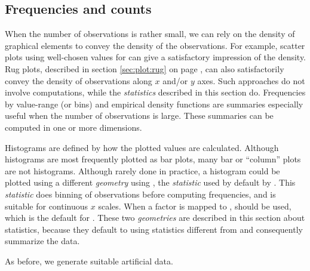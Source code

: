 \documentclass[krantz2]{krantz}\usepackage{knitr}
\begin{document}

\subsection{Frequencies and counts}\label{sec:histogram}\label{sec:plot:histogram}

When the number of observations is rather small, we can rely on the density of graphical elements to convey the density of the observations. For example, scatter plots using well-chosen values for  can give a satisfactory impression of the density. Rug plots, described in section \ref{sec:plot:rug} on page \pageref{sec:plot:rug}, can also satisfactorily convey the density of observations along $x$ and/or $y$ axes. Such approaches do not involve computations, while the \emph{statistics} described in this section do. Frequencies by value-range (or bins) and empirical density functions are summaries especially useful when the number of observations is large. These summaries can be computed in one or more dimensions.

Histograms are defined by how the plotted values are calculated. Although histograms are most frequently plotted as bar plots, many bar or ``column'' plots are not histograms. Although rarely done in practice, a histogram could be plotted using a different \emph{geometry} using , the \emph{statistic} used by default by . This \emph{statistic} does binning of observations before computing frequencies, and is suitable for continuous $x$ scales. When a factor is mapped to ,  should be used, which is the default  for . These two \emph{geometries} are described in this section about statistics, because they default to using statistics different from  and consequently summarize the data.

As before, we generate suitable artificial data.

\begin{knitrout}\footnotesize
{}\color{fgcolor}\begin{kframe}
\begin{alltt}
\hlstd{(}\hlstd{)}
 \hlkwb{<-}
  \hlstd{(} \hlstd{=} \hlstd{(}\hlstd{),}
              \hlstd{=} \hlstd{(}\hlstd{(}\hlstd{,} \hlopt{-}\hlstd{,} \hlstd{),} \hlstd{(}\hlstd{,} \hlstd{,} \hlstd{)),}
              \hlstd{=} \hlstd{(}\hlstd{(}\hlstd{(}\hlstd{,} \hlstd{),} \hlstd{(}\hlstd{,} \hlstd{))) )}
\end{alltt}
\end{kframe}
\end{knitrout}
\end{document}
